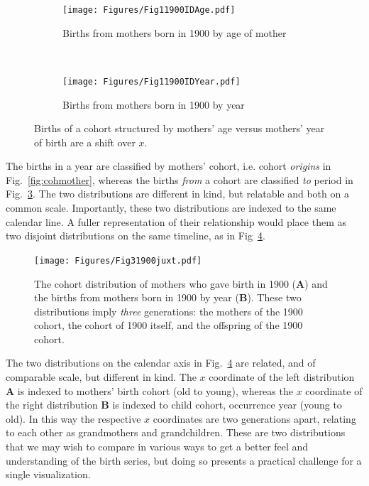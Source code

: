 \documentclass{article}
\begin{document}
\begin{figure}[ht!]
\begin{subfigure}[t]{0.5\textwidth}
        \centering
        \texttt{[image: Figures/Fig11900IDAge.pdf]}
        \caption{Births from mothers born in 1900 by age of mother}
        \label{fig:age1900mother}
\end{subfigure}
~
\begin{subfigure}[t]{0.5\textwidth}
        \centering
        \texttt{[image: Figures/Fig11900IDYear.pdf]}
        \caption{Births from mothers born in 1900 by year}
          \label{fig:year1900}
\end{subfigure}
\caption{Births of a cohort structured by mothers' age versus mothers' year of birth are a shift over $x$. }
\end{figure}

The births in a year are classified by mothers' cohort, i.e. cohort \emph{origins} in Fig.~\ref{fig:cohmother}, whereas the births \emph{from} a cohort are classified \emph{to} period in Fig.~\ref{fig:year1900}. The two distributions are different in kind, but relatable and both on a common scale. Importantly, these two distributions are indexed to the same calendar line. A fuller representation of their relationship would place them as two disjoint distributions on the same timeline, as in Fig~\ref{fig:juxt}.

\begin{figure}[ht!]
 \centering
        \texttt{[image: Figures/Fig31900juxt.pdf]}
        \caption{The cohort distribution of mothers who gave birth in 1900 (\textbf{A}) and the births from mothers born in 1900 by year (\textbf{B}). These two distributions imply \emph{three} generations: the mothers of the 1900 cohort, the cohort of 1900 itself, and the offspring of the 1900 cohort.}
          \label{fig:juxt}
\end{figure}

The two distributions on the calendar axis in Fig.~\ref{fig:juxt} are related, and of comparable scale, but different in kind. The $x$ coordinate of the left distribution \textbf{A} is indexed to mothers' birth cohort (old to young), whereas the $x$ coordinate of the right distribution \textbf{B} is indexed to child cohort, occurrence year (young to old). In this way the respective $x$ coordinates are two generations apart, relating to each other as grandmothers and grandchildren. These are two distributions that we may wish to compare in various ways to get a better feel and understanding of the birth series, but doing so presents a practical challenge for a single visualization. 
\end{document}
